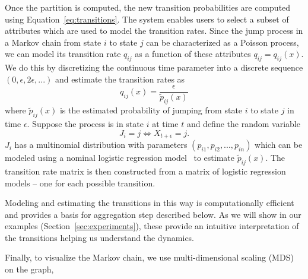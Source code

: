 

Once the partition is computed, the new transition probabilities are computed using Equation~\ref{eq:transitions}.
%
The system enables users to select a subset of attributes which are used to model the transition rates. Since the
jump process in a Markov chain from state $i$ to state $j$ can be characterized as a Poisson process, we can model its
transition rate $q_{ij}$ as a function of these attributes $q_{ij} = q_{ij}(x)$. We do this by discretizing the continuous time parameter into a discrete sequence $(0, \epsilon, 2\epsilon, ...)$ and
estimate the transition rates as
\begin{equation}
	\label{eq:transitions}
	q_{ij}(x) = \frac{\epsilon}{\tilde{p}_{ij}(x)}
\end{equation}
where $\tilde{p}_{ij}(x)$ is the estimated probability of jumping from state $i$ to state $j$ in time
$\epsilon$.
%
Suppose the process is in state $i$ at time $t$ and define the random variable 
$$J_i = j \Leftrightarrow X_{t + \epsilon} = j.$$
$J_i$  has a multinomial distribution with parameters $(p_{i1}, p_{i2}, ..., p_{in})$ which can be 
modeled using a nominal logistic regression model~\cite{glm-introduction} to estimate $\tilde{p}_{ij}(x)$.
The transition rate matrix is then constructed from a matrix of logistic regression models -- one for each possible transition. 

Modeling and estimating the transitions in this way is computationally efficient and provides a basis for aggregation step described below. As we will show in our examples (Section~\ref{sec:experiments}), these provide an intuitive interpretation of the transitions helping us understand the dynamics. 	

Finally, to visualize the Markov chain, we use multi-dimensional scaling (MDS) \cite{cox2000multidimensional} on the graph, 

